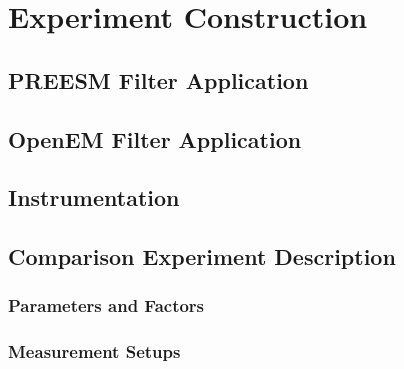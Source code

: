 \chapter{Experiment Construction}
\label{chapter:construction}


\section{PREESM Filter Application}
\label{sec:preesmapp}


\section{OpenEM Filter Application}
\label{sec:oemapp}


\section{Instrumentation}
\label{sec:instrumentation}


\section{Comparison Experiment Description}
\label{sec:experiment-description}


\subsection{Parameters and Factors}
\label{subsec:parameters-and-factors}


\subsection{Measurement Setups}
\label{subsec:measurement-setups}

